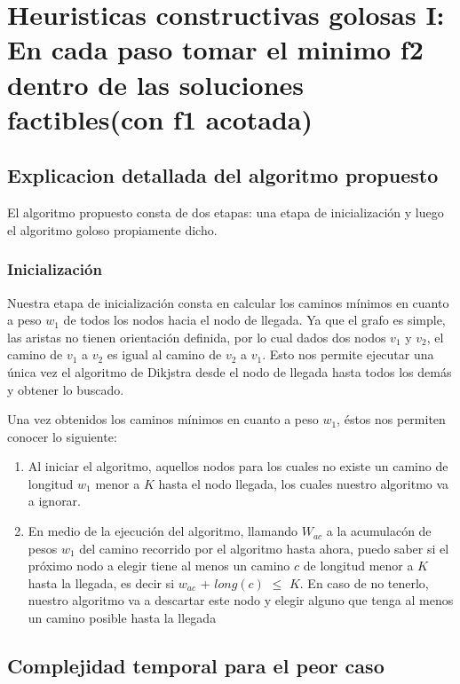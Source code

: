 \section{Heuristicas constructivas golosas I: En cada paso tomar el minimo f2 dentro de las soluciones factibles(con f1 acotada)}
\subsection{Explicacion detallada del algoritmo propuesto}

El algoritmo propuesto consta de dos etapas: una etapa de inicializaci\'on y luego el algoritmo goloso propiamente dicho.

\subsubsection{Inicializaci\'on}

Nuestra etapa de inicializaci\'on consta en calcular los caminos m\'inimos en cuanto a peso $w_1$ de todos los nodos hacia el nodo de llegada. Ya que el grafo es simple, las aristas no tienen orientaci\'on definida, por lo cual dados dos nodos $v_1$ y $v_2$, el camino de $v_1$ a $v_2$ es igual al camino de $v_2$ a $v_1$. Esto nos permite ejecutar una \'unica vez el algoritmo de Dikjstra desde el nodo de llegada hasta todos los dem\'as y obtener lo buscado.

Una vez obtenidos los caminos m\'inimos en cuanto a peso $w_1$, \'estos nos permiten conocer lo siguiente:

\begin{enumerate}
\item Al iniciar el algoritmo, aquellos nodos para los cuales no existe un camino de longitud $w_1$ menor a $K$ hasta el nodo llegada, los cuales nuestro algoritmo va a ignorar.
\item En medio de la ejecuci\'on del algoritmo, llamando $W_{ac}$ a la acumulac\'on de pesos $w_1$ del camino recorrido por el algoritmo hasta ahora, puedo saber si el pr\'oximo nodo a elegir tiene al menos un camino $c$ de longitud menor a $K$ hasta la llegada, es decir si $w_{ac}$ + $long(c)$ $\leq$ $K$. En caso de no tenerlo, nuestro algoritmo va a descartar este nodo y elegir alguno que tenga al menos un camino posible hasta la llegada
\end{enumerate}

\subsection{Complejidad temporal para el peor caso}
